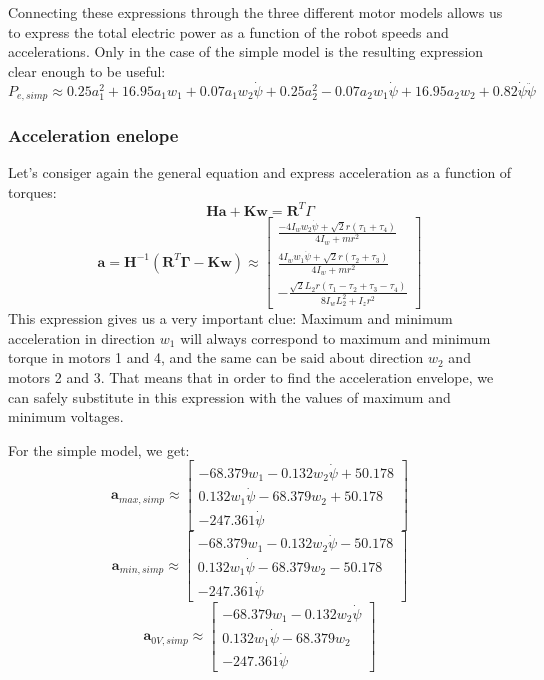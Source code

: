 \documentclass[12pt]{article}
\renewcommand{\vec}[1]{\bm{#1}}
\newcommand{\R}{\mathbb R}
\def\R{\vec R}
\begin{document}
Connecting these expressions through the three different motor models allows us to express the total electric power as a function of the robot speeds and accelerations. Only in the case of the simple model is the resulting expression clear enough to be useful: 
$$ P_{e, simp} \approx 0.25 a_{1}^{2} + 16.95 a_{1} w_{1} + 0.07 a_{1} w_{2} \dot{\psi} + 0.25 a_{2}^{2} - 0.07 a_{2} w_{1} \dot{\psi} + 16.95 a_{2} w_{2} + 0.82 \dot{\psi} \ddot{\psi} $$

\subsubsection{Acceleration enelope}
Let's consiger again the general equation and express acceleration as a function of torques:
$$ \vec H\vec a+\vec K\vec w=\R^T\Gamma$$
$$ \vec a = \vec H^{-1}(\R^T\vec\Gamma - \vec K \vec w) \approx \left[\begin{matrix}\frac{- 4 I_{w} w_{2} \dot{\psi} + \sqrt{2} r \left(\tau_{1} + \tau_{4}\right)}{4 I_{w} + m r^{2}}\\\frac{4 I_{w} w_{1} \dot{\psi} + \sqrt{2} r \left(\tau_{2} + \tau_{3}\right)}{4 I_{w} + m r^{2}}\\- \frac{\sqrt{2} L_{2} r \left(\tau_{1} - \tau_{2} + \tau_{3} - \tau_{4}\right)}{8 I_{w} L_{2}^{2} + I_{z} r^{2}}\end{matrix}\right]$$
This expression gives us a very important clue: Maximum and minimum acceleration in direction $w_1$ will always correspond to maximum and minimum torque in motors 1 and 4, and the same can be said about direction $w_2$ and motors 2 and 3. That means that in order to find the acceleration envelope, we can safely substitute in this expression with the values of maximum and minimum voltages.

For the simple model, we get:
$$\vec a_{max, simp} \approx \left[\begin{matrix}- 68.379 w_{1} - 0.132 w_{2} \dot{\psi} + 50.178\\0.132 w_{1} \dot{\psi} - 68.379 w_{2} + 50.178\\- 247.361 \dot{\psi}\end{matrix}\right]$$
$$\vec a_{min, simp} \approx \left[\begin{matrix}- 68.379 w_{1} - 0.132 w_{2} \dot{\psi} - 50.178\\0.132 w_{1} \dot{\psi} - 68.379 w_{2} - 50.178\\- 247.361 \dot{\psi}\end{matrix}\right]$$
$$\vec a_{0V, simp} \approx \left[\begin{matrix}- 68.379 w_{1} - 0.132 w_{2} \dot{\psi}\\0.132 w_{1} \dot{\psi} - 68.379 w_{2}\\- 247.361 \dot{\psi}\end{matrix}\right]$$
\end{document}

